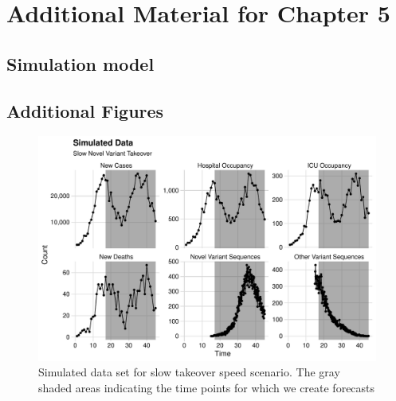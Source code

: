 \chapter{Additional Material for Chapter 5}
\graphicspath{{figures/ch_5/}}

\section{Simulation model}
\label{ch_5:sec:full_simulation_model_explanation}

\section{Additional Figures}

\begin{figure}
    \centering
    \includegraphics[width=1.0\columnwidth]{simulated_binned_data_slow_plot}
    \caption[Simulated data set for slow takeover speed scenario.]{Simulated data set for slow takeover speed scenario.
    The gray shaded areas indicating the time points for which we create forecasts}
    \label{ch_5:fig:simulated_binned_data_slow_plot}
\end{figure}

